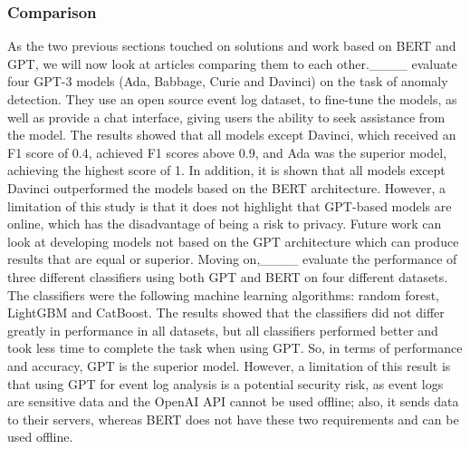 \subsubsection{Comparison}
As the two previous sections touched on solutions and work based on BERT and GPT, we will now look at articles comparing them to each other.____ evaluate four GPT-3 models (Ada, Babbage, Curie and Davinci) on the task of anomaly detection. They use an open source event log dataset, to fine-tune the models, as well as provide a chat interface, giving users the ability to seek assistance from the model. The results showed that all models except Davinci, which received an F1 score of 0.4, achieved F1 scores above 0.9, and Ada was the superior model, achieving the highest score of 1. In addition, it is shown that all models except Davinci outperformed the models based on the BERT architecture. However, a limitation of this study is that it does not highlight that GPT-based models are online, which has the disadvantage of being a risk to privacy. Future work can look at developing models not based on the GPT architecture which can produce results that are equal or superior. Moving on,____ evaluate the performance of three different classifiers using both GPT and BERT on four different datasets. The classifiers were the following machine learning algorithms: random forest, LightGBM and CatBoost. The results showed that the classifiers did not differ greatly in performance in all datasets, but all classifiers performed better and took less time to complete the task when using GPT. So, in terms of performance and accuracy, GPT is the superior model. However, a limitation of this result is that using GPT for event log analysis is a potential security risk, as event logs are sensitive data and the OpenAI API cannot be used offline; also, it sends data to their servers, whereas BERT does not have these two requirements and can be used offline. 

